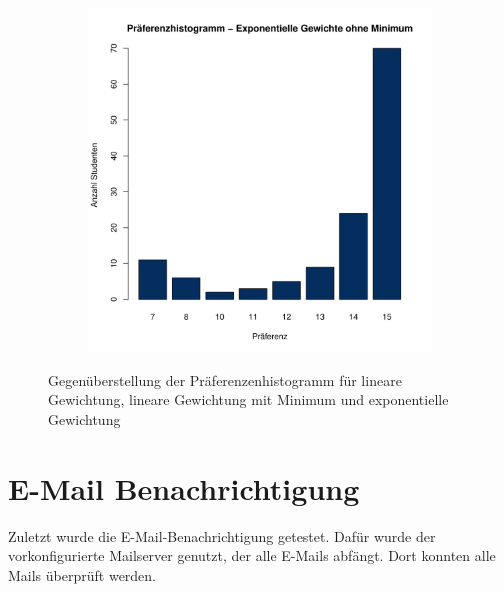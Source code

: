 \begin{figure}
\begin{subfigure}{0.30\textwidth}
				\end{subfigure}
			\begin{subfigure}{0.3\textwidth}
				\includegraphics[width=1.0\textwidth]{./testing/images/NormalDistPreferencesHistExpo.jpg}
			\end{subfigure}
				\caption{Gegenüberstellung der Präferenzenhistogramm für lineare Gewichtung, lineare Gewichtung mit Minimum und exponentielle Gewichtung}
				\label{fig:test_norm_distribution_histogram}
			\end{figure}
		
	\section{E-Mail Benachrichtigung}
		Zuletzt wurde die E-Mail-Benachrichtigung getestet.
		Dafür wurde der vorkonfigurierte Mailserver genutzt, der alle E-Mails abfängt.
		Dort konnten alle Mails überprüft werden.
		
		
		
		
		
		
		
		
		
		
		
		
		
		
		
		
		
		
		
		
		
		
		
		
		
